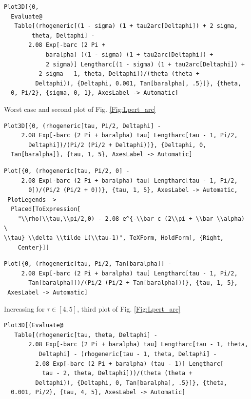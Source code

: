 \documentclass[reqno]{amsart}
\theoremstyle{definition} \newtheorem{definition}{Definition}[section]
\theoremstyle{definition} \newtheorem{remark}[definition]{Remark}
\theoremstyle{plain} \newtheorem{lemma}[definition]{Lemma}
\theoremstyle{plain} \newtheorem{proposition}[definition]{Proposition}
\theoremstyle{plain} \newtheorem{theorem}[definition]{Theorem}
\theoremstyle{plain} \newtheorem{corollary}[definition]{Corollary}
\theoremstyle{definition} \newtheorem{example}[definition]{Example}
\theoremstyle{plain} \newtheorem{claim}[clai]{Claim}
\theoremstyle{definition} \newtheorem{assumption}[definition]{Assumption}
\theoremstyle{definition} \newtheorem{observation}[definition]{Observation}
\newcommand{\1}{\mathbbm 1}
\newcommand{\smed}{\medskip}
\numberwithin{equation}{section} %
\theoremstyle{plain} \newtheorem*{theorem*}{Theorem}
\theoremstyle{plain} \newtheorem{mthm}[maintheorem]{Main Theorem}
\theoremstyle{plain} \newtheorem*{mthm*}{Main Theorem}
\theoremstyle{plain} \newtheorem*{conjecture*}{Conjecture}
\theoremstyle{plain} \newtheorem{conjecture}[definition]{Conjecture}
\theoremstyle{plain} \newtheorem*{problem*}{Problem}
\begin{document}
\begin{verbatim}
Plot3D[{0, 
  Evaluate@
   Table[(rhogeneric[(1 - sigma) (1 + tau2arc[Deltaphi]) + 2 sigma, 
        theta, Deltaphi] - 
       2.08 Exp[-barc (2 Pi + 
            baralpha) ((1 - sigma) (1 + tau2arc[Deltaphi]) + 
            2 sigma)] Lengtharc[(1 - sigma) (1 + tau2arc[Deltaphi]) + 
          2 sigma - 1, theta, Deltaphi])/(theta (theta + 
         Deltaphi)), {Deltaphi, 0.001, Tan[baralpha], .5}]}, {theta, 
  0, Pi/2}, {sigma, 0, 1}, AxesLabel -> Automatic]
\end{verbatim}
\smed
Worst case and second plot of Fig. \ref{Fig:Lpert_arc}
\smed
\begin{verbatim}
Plot3D[{0, (rhogeneric[tau, Pi/2, Deltaphi] - 
     2.08 Exp[-barc (2 Pi + baralpha) tau] Lengtharc[tau - 1, Pi/2, 
       Deltaphi])/(Pi/2 (Pi/2 + Deltaphi))}, {Deltaphi, 0, 
  Tan[baralpha]}, {tau, 1, 5}, AxesLabel -> Automatic]
\end{verbatim}
\begin{verbatim}
Plot[{0, (rhogeneric[tau, Pi/2, 0] - 
     2.08 Exp[-barc (2 Pi + baralpha) tau] Lengtharc[tau - 1, Pi/2, 
       0])/(Pi/2 (Pi/2 + 0))}, {tau, 1, 5}, AxesLabel -> Automatic, 
 PlotLegends -> 
  Placed[ToExpression[
    "\\rho(\\tau,\\pi/2,0) - 2.08 e^{-\\bar c (2\\pi + \\bar \\alpha) \
\\tau} \\delta \\tilde L(\\tau-1)", TeXForm, HoldForm], {Right, 
    Center}]]
\end{verbatim}
\begin{verbatim}
Plot[{0, (rhogeneric[tau, Pi/2, Tan[baralpha]] - 
     2.08 Exp[-barc (2 Pi + baralpha) tau] Lengtharc[tau - 1, Pi/2, 
       Tan[baralpha]])/(Pi/2 (Pi/2 + Tan[baralpha]))}, {tau, 1, 5}, 
 AxesLabel -> Automatic]
\end{verbatim}
\smed
Increasing for $\tau \in [4,5]$, third plot of Fig. \ref{Fig:Lpert_arc}
\smed
\begin{verbatim}
Plot3D[{Evaluate@
   Table[(rhogeneric[tau, theta, Deltaphi] - 
       2.08 Exp[-barc (2 Pi + baralpha) tau] Lengtharc[tau - 1, theta,
          Deltaphi] - (rhogeneric[tau - 1, theta, Deltaphi] - 
         2.08 Exp[-barc (2 Pi + baralpha) (tau - 1)] Lengtharc[
           tau - 2, theta, Deltaphi]))/(theta (theta + 
         Deltaphi)), {Deltaphi, 0, Tan[baralpha], .5}]}, {theta, 
  0.001, Pi/2}, {tau, 4, 5}, AxesLabel -> Automatic]
\end{verbatim}
\end{document}
